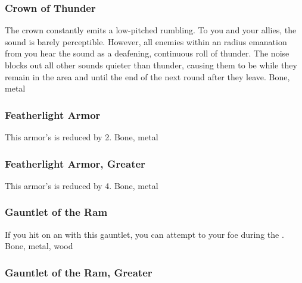 \hypertarget{item:Crown of Thunder}{\subsubsection{Crown of Thunder\hfill{}}}
The crown constantly emits a low-pitched rumbling.
To you and your allies, the sound is barely perceptible.
However, all enemies within an \arealarge radius emanation from you hear the sound as a deafening, continuous roll of thunder.
The noise blocks out all other sounds quieter than thunder, causing them to be \deafened while they remain in the area and until the end of the next round after they leave.
 
 Bone, metal
\lowercase{\hypertarget{item:Featherlight Armor}{}}\label{item:Featherlight Armor}
\hypertarget{item:Featherlight Armor}{\subsubsection{Featherlight Armor\hfill{}}}
This armor's  is reduced by 2.
 
 Bone, metal
\lowercase{\hypertarget{item:Featherlight Armor, Greater}{}}\label{item:Featherlight Armor, Greater}
\hypertarget{item:Featherlight Armor, Greater}{\subsubsection{Featherlight Armor, Greater\hfill{}}}
This armor's  is reduced by 4.
 
 Bone, metal
\lowercase{\hypertarget{item:Gauntlet of the Ram}{}}\label{item:Gauntlet of the Ram}
\hypertarget{item:Gauntlet of the Ram}{\subsubsection{Gauntlet of the Ram\hfill{}}}
If you hit on an   with this gauntlet, you can attempt to  your foe during the .
 
 Bone, metal, wood
\lowercase{\hypertarget{item:Gauntlet of the Ram, Greater}{}}\label{item:Gauntlet of the Ram, Greater}
\hypertarget{item:Gauntlet of the Ram, Greater}{\subsubsection{Gauntlet of the Ram, Greater\hfill{}}}
